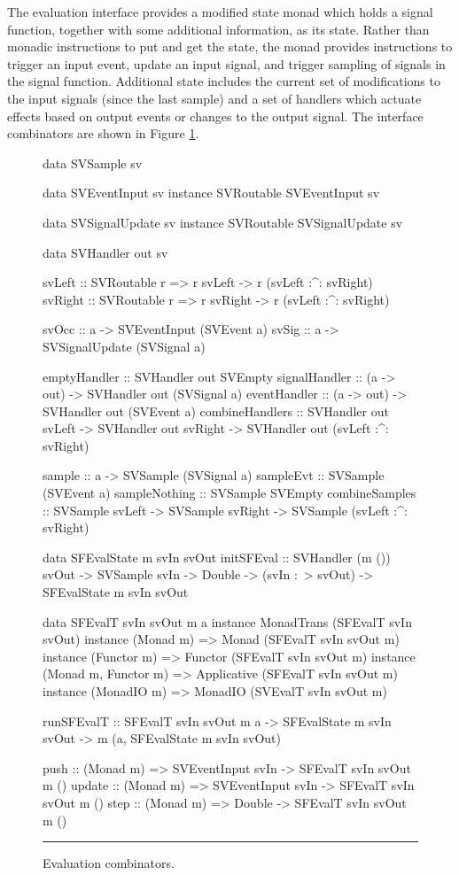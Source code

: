 The evaluation interface provides a modified state monad which holds a signal
function, together with some additional information, as its state. Rather than
monadic instructions to put and get the state, the monad provides instructions
to trigger an input event, update an input signal, and trigger sampling of
signals in the signal function. Additional state includes the current set of
modifications to the input signals (since the last sample) and a set of
handlers which actuate effects based on output events or changes to the output
signal. The interface combinators are shown in Figure \ref{figure:evaluation_combinators}.

\begin{figure}
\begin{code}
data SVSample sv

data SVEventInput sv
instance SVRoutable SVEventInput sv

data SVSignalUpdate sv
instance SVRoutable SVSignalUpdate sv

data SVHandler out sv

svLeft          :: SVRoutable r =>
                   r svLeft -> r (svLeft :^: svRight)
svRight         :: SVRoutable r =>
                   r svRight -> r (svLeft :^: svRight)

svOcc           :: a -> SVEventInput (SVEvent a)
svSig           :: a -> SVSignalUpdate (SVSignal a)
 
emptyHandler    :: SVHandler out SVEmpty
signalHandler   :: (a -> out) -> SVHandler out (SVSignal a)
eventHandler    :: (a -> out) -> SVHandler out (SVEvent a)
combineHandlers ::    SVHandler out svLeft
                   -> SVHandler out svRight
                   -> SVHandler out (svLeft :^: svRight)

sample          :: a -> SVSample (SVSignal a)
sampleEvt       :: SVSample (SVEvent a)
sampleNothing   :: SVSample SVEmpty
combineSamples  ::    SVSample svLeft
                   -> SVSample svRight
                   -> SVSample (svLeft :^: svRight)

data SFEvalState m svIn svOut
initSFEval ::    SVHandler (m ()) svOut
              -> SVSample svIn
              -> Double
              -> (svIn :~> svOut)
              -> SFEvalState m svIn svOut

data SFEvalT svIn svOut m a
instance MonadTrans (SFEvalT svIn svOut)
instance (Monad m) => Monad (SFEvalT svIn svOut m)
instance (Functor m) => Functor (SFEvalT svIn svOut m)
instance (Monad m, Functor m) => Applicative (SFEvalT svIn svOut m)
instance (MonadIO m) => MonadIO (SVEvalT svIn svOut m)

runSFEvalT ::    SFEvalT svIn svOut m a
              -> SFEvalState m svIn svOut
              -> m (a, SFEvalState m svIn svOut)
              
push :: (Monad m) => SVEventInput svIn -> SFEvalT svIn svOut m ()
update :: (Monad m) => SVEventInput svIn -> SFEvalT svIn svOut m ()
step :: (Monad m) => Double -> SFEvalT svIn svOut m ()
\end{code}
\hrule
\caption{Evaluation combinators.}
\label{figure:evaluation_combinators}
\end{figure}

